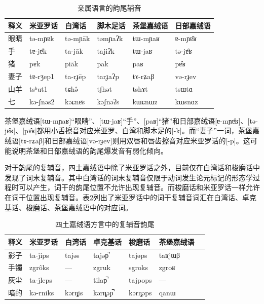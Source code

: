 \begin{table}[H]
	\centering
	\caption{亲属语言的韵尾辅音}
	\label{tab:coda-comparison}
	\vspace{5pt}
	\begin{tabular}{llllll}
		\toprule
		释义 & 米亚罗话 & 白湾话 & 脚木足话 & 茶堡嘉绒语 & 日部嘉绒语\\
		\midrule
		眼睛 & tə-mɲɐk & tə-mɲāk & təmɲaʔk & tɯ-mɲaʁ & ɐ-mɲɐ̂ʁ\\
		手 & tɐ-jɐ̂k & ta-jāk & tajiʔk & tɯ-jaʁ & tə-jɐ̂ʁ\\
		猪 & pɐk & piāk & pak &  paʁ & pɐ̂ʁ\\
		妻子 & tɐ-rʒep1 & ta-rɟēp & tarɟaʔp & tɤ-rʑaβ & və-rɟev\\
		山羊 & tsʰut1 & tɕhə̂ & tʃhət & tshɤt & tsɯtɑ\\
		七 & kə-ʃnəs2 & kəɕnɐ̄s & kəʃnəʔs & kɯɕnɯz & kɯsnɑz\\
		\bottomrule
	\end{tabular}
\end{table}

茶堡嘉绒语[tɯ-mɲaʁ]“眼睛”、[tɯ-jaʁ]“手”、[paʁ]“猪”和日部嘉绒语[ɐ-mɲɐ̂ʁ]、[tə-jɐ̂ʁ]、[pɐ̂ʁ]都用小舌擦音对应米亚罗、白湾和脚木足的[-k]。而“妻子”一词，茶堡嘉绒语[tɤ-rʑaβ]和日部嘉绒语[və-rɟev]则用双唇和唇齿擦音对应米亚罗话的[-p]。这可能说明茶堡和日部嘉绒语的韵尾爆发音有弱化倾向。

对于韵尾的复辅音，四土嘉绒语中除了米亚罗话之外，目前仅在白湾话和梭磨话中发现了词末复辅音。其中白湾话的词末复辅音仅限于动词发生论元标记的形态学过程时可以产生\cite{zhang2016phonologie}，词干的韵尾位置不允许出现复辅音。而梭磨话和米亚罗话一样允许在词干位置出现复辅音。表\ref{clustercoda}列出了米亚罗话中的词干复辅音词汇在白湾话、卓克基话、梭磨话、茶堡嘉绒语中的对应词。

\begin{table}[H]
\vspace{5pt}
    \centering
    \caption{四土嘉绒语方言中的复辅音韵尾}
    \label{clustercoda}
\begin{tabular}{lllllll}
\toprule
释义 & 米亚罗话 & 白湾话 & 卓克基话 & 梭磨话 & 茶堡嘉绒语 \\
\midrule
影子 & ta-jips      & tajəs    & tajəp̚    & tajəps      & taʁjɯβ \\
手镯 & zgrôks     & ---      & zgruk   & sgroks     & zgroʁ \\
灰尘 & ta-jleps    & ---     & tilap̚  & tajpops   & --- \\
暗的 & kə-rniks     & kərȵis   & kərȵəp̚  & kərȵəps  & 	qanɯ \\
\bottomrule
\end{tabular}
\end{table}

